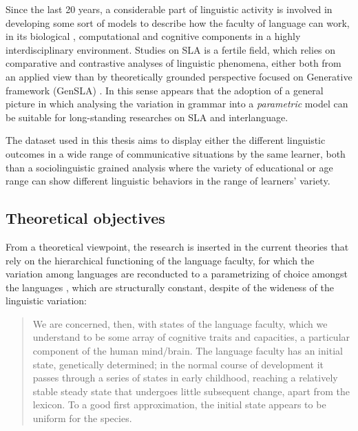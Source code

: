 \documentclass[a4paper,twoside,12pt,chapterprefix=false,bibliography=totocnumbered,listof=flat]{scrbook}
\theoremstyle{definition}
\theoremstyle{definition}
\theoremstyle{definition}
\theoremstyle{remark}
\begin{document}
Since the last 20 years, a considerable part of linguistic activity is
involved in developing some sort of models to describe how the faculty
of language can work, in its biological \citep{hcf2002}, computational
\citep{fodor2001} and cognitive components in a highly interdisciplinary
environment. Studies on SLA is a fertile field, which relies on
comparative and contrastive analyses of linguistic phenomena, either
both from an applied view \citep{ellis1994} than by theoretically
grounded perspective focused on Generative framework (GenSLA)
\citep{guasti2002, hawkins2001, rothmanslabakova2017, sorace2011}. In
this sense appears that the adoption of a general picture in which
analysing the variation in grammar into a \emph{parametric} model
\citep{chomsky1995} can be suitable for long-standing researches on SLA
and interlanguage.

The dataset used in this thesis aims to display either the different
linguistic outcomes in a wide range of communicative situations by the
same learner, both than a sociolinguistic grained analysis where the
variety of educational or age range can show different linguistic
behaviors in the range of learners' variety.

\subsection{Theoretical objectives}\label{theoretical-objectives}

From a theoretical viewpoint, the research is inserted in the current
theories that rely on the hierarchical functioning of the language
faculty, for which the variation among languages are reconducted to a
parametrizing of choice amongst the languages
\citep{adger2013, chomsky1995, chomsky1998, chomsky2013, chomsky2015, rizzi2013},
which are structurally constant, despite of the wideness of the
linguistic variation:

\begin{quote}
We are concerned, then, with states of the language faculty, which we
understand to be some array of cognitive traits and capacities, a
particular component of the human mind/brain. The language faculty has
an initial state, genetically determined; in the normal course of
development it passes through a series of states in early childhood,
reaching a relatively stable steady state that undergoes little
subsequent change, apart from the lexicon. To a good first
approximation, the initial state appears to be uniform for the species.
\citep{chomsky1995}
\end{quote}
\end{document}
